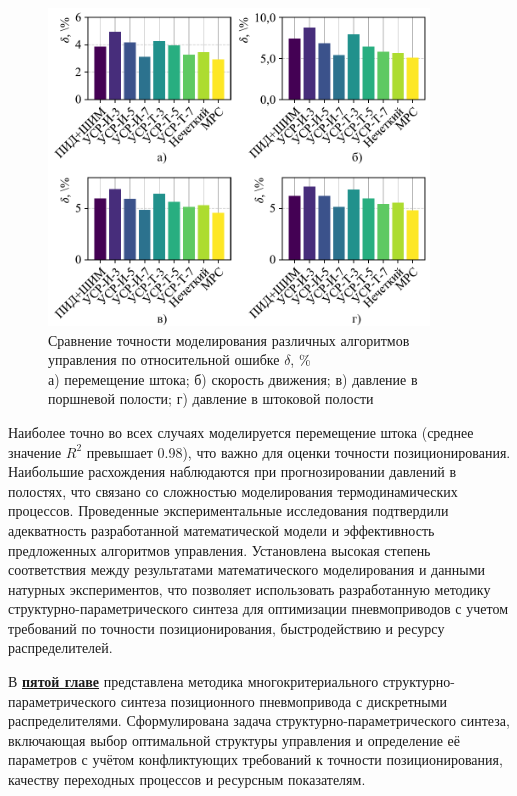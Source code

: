 \begin{figure}[h]
	\centering
	\includegraphics[width=0.9\textwidth]{Dissertation/images/part4/verification/delta_diagram.pdf}
	\caption{Сравнение точности моделирования различных алгоритмов управления по относительной ошибке $\delta$, \%\\
	а) перемещение штока; б) скорость движения; в) давление в поршневой полости; г) давление в штоковой полости}
	\label{fig3}
\end{figure}
Наиболее точно во всех случаях моделируется перемещение штока (среднее значение $R^2$ превышает \num{0.98}),
что важно для оценки точности позиционирования. Наибольшие расхождения наблюдаются при прогнозировании давлений
в полостях, что связано со сложностью моделирования термодинамических процессов.
Проведенные экспериментальные исследования подтвердили адекватность разработанной математической модели и
эффективность предложенных алгоритмов управления. Установлена высокая степень соответствия между результатами
математического моделирования и данными натурных экспериментов, что позволяет использовать разработанную методику
структурно-параметрического синтеза для оптимизации пневмоприводов с учетом требований по
точности позиционирования, быстродействию и ресурсу распределителей.

В \underline{\textbf{пятой главе}}
представлена методика многокритериального структурно-параметрического синтеза
позиционного пневмопривода с дискретными распределителями. Сформулирована задача структурно-параметрического
синтеза, включающая выбор оптимальной структуры управления и определение её параметров с учётом конфликтующих
требований к точности позиционирования, качеству переходных процессов и ресурсным показателям.

